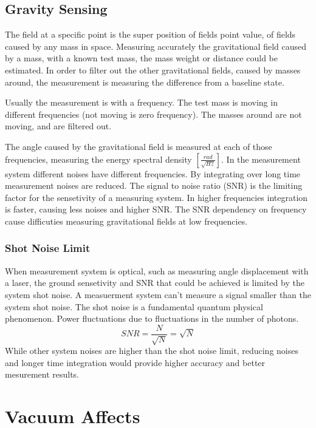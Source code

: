 \documentclass[\main/master.tex]{subfiles}
\begin{document}
\subsection{Gravity Sensing}
The field at a specific point is the super position of fields point value, of fields caused by any mass in space. Measuring accurately the gravitational field caused by a mass, with a known test mass, the mass weight or distance could be estimated. In order to filter out the other gravitational fields, caused by masses around, the measurement is measuring the difference from a baseline state.
\par
Usually the measurement is with a frequency. The test mass is moving in different frequencies (not moving is zero frequency). The masses around are not moving, and are filtered out.
\par
The angle caused by the gravitational field is measured at each of those frequencies, measuring the energy spectral density $[\frac{rad}{\sqrt{Hz}}]$.
In the measurement system different noises have different frequencies. By integrating over long time measurement noises are reduced. The signal to noise ratio (SNR) is the limiting factor for the sensetivity of a measuring system. In higher frequencies integration is faster, causing less noises and higher SNR.
The SNR dependency on frequency cause difficuties measuring gravitational fields at low frequencies.

\subsubsection{Shot Noise Limit}
When measurement system is optical, such as measuring angle displacement with a laser, the ground sensetivity and SNR that could be achieved is limited by the system shot noise. A measuerment system can't measure a signal smaller than the system shot noise. The shot noise is a fundamental quantum physical phenomenon. Power fluctuations due to fluctuations in the number of photons. 
\begin{equation}
SNR = \frac{N}{\sqrt{N}} = \sqrt{N}    \label{eqn:shot_noise}
\end{equation}
While other system noises are higher than the shot noise limit, reducing noises and longer time integration would provide higher accuracy and better mesurement results. 


\section{Vacuum Affects}
\end{document}
